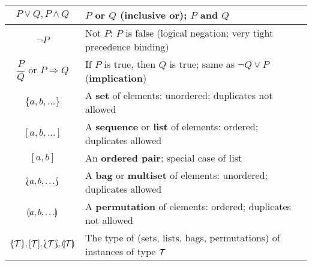 {\begin{tabular}{|c|l|}
			$P\lor Q, P\land Q$ & $P$ or $Q$ (inclusive or); 
			  $P$ and $Q$\\ \hline
			
			$\lnot P$ & Not $P$; $P$ is false (logical negation;
			  very tight precedence binding)\\ \hline
			
			\rule{0ex}{3.2ex}$\dfrac{P}{Q}$ or $P\Rightarrow Q$ 
			  & If $P$ is true, then $Q$ is true; same as $\lnot 
			  Q \lor P$ (\textbf{implication})\\ \hline
			
			$\{a,b,\ldots\}$ & A \textbf{set} of elements:
			  unordered; duplicates not allowed \\ \hline
			
			$[a, b, \ldots]$ & A \textbf{sequence} or
			  \textbf{list} of elements: ordered; duplicates
			  allowed\\ \hline
			    
			$[a,b]$ & An \textbf{ordered pair}; special case 
			  of list\\ \hline
			
			$\Lbag a, b,\ldots\Rbag$ & A \textbf{bag} or
			  \textbf{multiset} of elements: unordered; 
			  duplicates allowed\\ \hline
			
			$\llparenthesis a, b, \ldots\rrparenthesis$ & A \textbf{permutation} 
			  of elements: ordered; duplicates not 
			  allowed \\ \hline
			
			$\{\mathcal{T}\}, [\mathcal{T}], \Lbag \mathcal{T}\Rbag, \llparenthesis \mathcal{T}\rrparenthesis$ 
			  & The type of (sets, lists, bags, permutations)
			  of instances of type $\mathcal{T}$ \\ \hline
			  
		\end{tabular}
			\label{tbl:aide-memoire}
}

